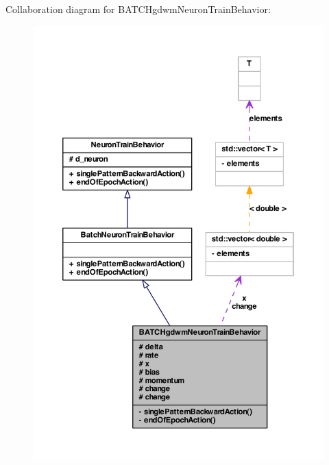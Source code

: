 Collaboration diagram for BATCHgdwmNeuronTrainBehavior:
\nopagebreak
\begin{figure}[H]
\begin{center}
\leavevmode
\includegraphics[width=381pt]{class_b_a_t_c_hgdwm_neuron_train_behavior__coll__graph}
\end{center}
\end{figure}
